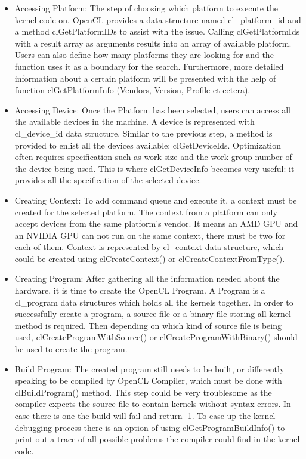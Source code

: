 \begin{itemize}
	\item Accessing Platform: The step of choosing which platform to execute the kernel code on. OpenCL provides a data structure named cl\_platform\_id and a method clGetPlatformIDs to assist with the issue. Calling clGetPlatformIds with a result array as arguments results into an array of available platform. Users can also define how many platforms they are looking for and the function uses it as a boundary for the search. Furthermore, more detailed information about a certain platform will be presented with the help of function clGetPlatformInfo (Vendors, Version, Profile et cetera).
	\item Accessing Device: Once the Platform has been selected, users can access all the available devices in the machine. A device is represented with cl\_device\_id data structure. Similar to the previous step, a method is provided to enlist all the devices available: clGetDeviceIds. Optimization often requires specification such as work size and the work group number of the device being used. This is where clGetDeviceInfo becomes very useful: it provides all the specification of the selected device.
	\item Creating Context: To add command queue and execute it, a context must be created for the selected platform. The context from a platform can only accept devices from the same platform’s vendor. It means an AMD GPU and an NVIDIA GPU can not run on the same context, there must be two for each of them. Context is represented by cl\_context data structure, which could be created using clCreateContext() or clCreateContextFromType().
	\item Creating Program:  After gathering all the information needed about the hardware, it is time to create the OpenCL Program. A Program is a cl\_program data structures which holds all the kernels together. In order to successfully create a program, a source file or a binary file storing all kernel method is required. Then depending on which kind of source file is being used, clCreateProgramWithSource() or clCreateProgramWithBinary() should be used to create the program. 
	\item Build Program: The created program still needs to be built, or differently speaking to be compiled by OpenCL Compiler, which must be done with clBuildProgram() method. This step could be very troublesome as the compiler expects the source file to contain kernels without syntax errors. In case there is one the build will fail and return -1. To ease up the kernel debugging process there is an option of using clGetProgramBuildInfo() to print out a trace of all possible problems the compiler could find in the kernel code.

\end{itemize}
